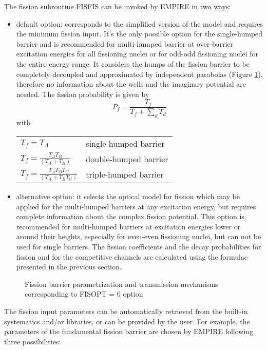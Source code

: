 \documentclass[twocolumn,amsmath,amssymb,10pt,groupedaddress,a4paper]{revtex4}
\begin{document}
The fission subroutine FISFIS can be invoked by EMPIRE in two
ways:
\begin{itemize}
\item default option: corresponds to the simplified version
of the model and requires the minimum fission input. It's the only
possible option for the single-humped barrier and is recommended for
multi-humped barrier at over-barrier excitation energies for all fissioning
nuclei or for odd-odd fissioning nuclei for the entire energy range.
It considers the humps of the fission barrier to be completely decoupled
and approximated by independent parabolas (Figure \ref{cap:Fission-barrier-parametrization-0}),
therefore no information about the wells and the imaginary potential
are needed. The fission probability is given by
\begin{equation}
P_{f}=\frac{T_{f}}{T_{f}+\sum_{d}T_{d}}
\end{equation}
 with\\
\begin{tabular}{ll}
 $T_{f}=T_{A}$&
 single-humped barrier\tabularnewline
 $T_{f}=\frac{T_{A}T_{B}}{(T_{A}+T_{B})}$&
 double-humped barrier\tabularnewline
 $T_{f}=\frac{T_{A}T_{B}T_{C}}{(T_{A}+T_{B}T_{C})}$&
 triple-humped barrier \tabularnewline
\end{tabular}
\item alternative option: it selects the optical model for fission which may be applied
for the multi-humped barriers at any excitation energy, but requires
complete information about the complex fission potential.  This option
is recommended for multi-humped barriers at excitation energies lower
or around their heights, especially for even-even fissioning nuclei,
but can not be used for single barriers. The fission coefficients
and the decay probabilities for fission and for the competitive channels
are calculated using the formulae presented in the previous section.
\end{itemize}
%
\begin{figure}[top]
\caption{\label{cap:Fission-barrier-parametrization-0}Fission barrier parametrization
and transmission mechanisms corresponding to FISOPT = 0 option}
\end{figure}
The fission input parameters can be automatically retrieved from the
built-in systematics and/or libraries, or can be provided by the user.
For example, the parameters of the fundamental fission barrier are
chosen by EMPIRE following three possibilities:
\end{document}
